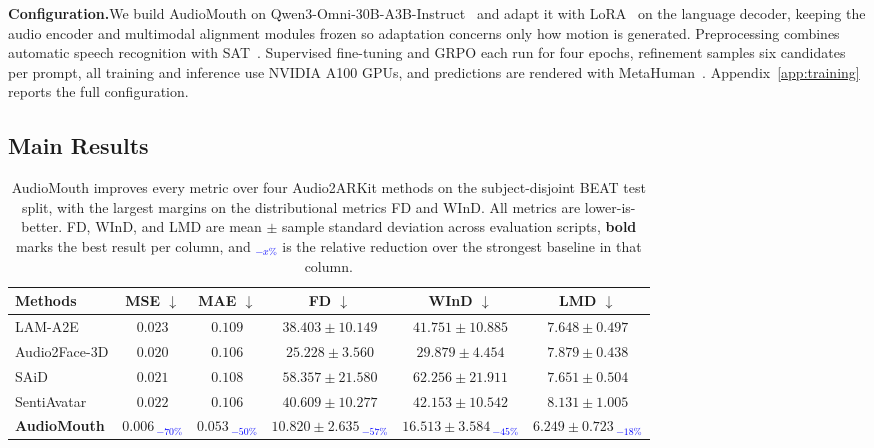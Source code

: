 \noindent\textbf{Configuration.}\quad We build AudioMouth on Qwen3-Omni-30B-A3B-Instruct~\citep{xu2025qwen3omni} and adapt it with LoRA~\citep{hu2021lora} on the language decoder, keeping the audio encoder and multimodal alignment modules frozen so adaptation concerns only how motion is generated. Preprocessing combines automatic speech recognition with SAT~\citep{frohmann2024segment}. Supervised fine-tuning and GRPO each run for four epochs, refinement samples six candidates per prompt, all training and inference use NVIDIA A100 GPUs, and predictions are rendered with MetaHuman~\citep{metahuman}. Appendix~\ref{app:training} reports the full configuration.

\subsection{Main Results}
\label{sec:main_results}

\begin{table}[t]
\centering
\caption{AudioMouth improves every metric over four Audio2ARKit methods on the subject-disjoint BEAT test split, with the largest margins on the distributional metrics FD and WInD. All metrics are lower-is-better. FD, WInD, and LMD are mean $\pm$ sample standard deviation across evaluation scripts, \textbf{bold} marks the best result per column, and \textcolor{blue}{$_{-x\%}$} is the relative reduction over the strongest baseline in that column.}
\label{tab:main}
\vspace{-1mm}
\scriptsize
{\renewcommand{\arraystretch}{1.12}
\begin{tabular*}{\textwidth}{@{\extracolsep{\fill}} lccccc @{}}
\toprule
\textbf{Methods} & \textbf{MSE $\downarrow$} & \textbf{MAE $\downarrow$} & \textbf{FD $\downarrow$} & \textbf{WInD $\downarrow$} & \textbf{LMD $\downarrow$} \\
\midrule
LAM-A2E                       & $0.023$ & $0.109$ & $38.403 \pm 10.149$ & $41.751 \pm 10.885$ & $7.648 \pm 0.497$ \\
Audio2Face-3D                 & $0.020$ & $0.106$ & $25.228 \pm 3.560$  & $29.879 \pm 4.454$  & $7.879 \pm 0.438$ \\
SAiD                          & $0.021$ & $0.108$ & $58.357 \pm 21.580$ & $62.256 \pm 21.911$ & $7.651 \pm 0.504$ \\
SentiAvatar                   & $0.022$ & $0.106$ & $40.609 \pm 10.277$ & $42.153 \pm 10.542$ & $8.131 \pm 1.005$ \\
\midrule
\rowcolor{gray!15}
\textbf{AudioMouth} & $\mathbf{0.006}$\,\textcolor{blue}{$_{-70\%}$} & $\mathbf{0.053}$\,\textcolor{blue}{$_{-50\%}$} & $\mathbf{10.820 \pm 2.635}$\,\textcolor{blue}{$_{-57\%}$} & $\mathbf{16.513 \pm 3.584}$\,\textcolor{blue}{$_{-45\%}$} & $\mathbf{6.249 \pm 0.723}$\,\textcolor{blue}{$_{-18\%}$} \\
\bottomrule
\end{tabular*}
}
\vspace{-4mm}
\end{table}

